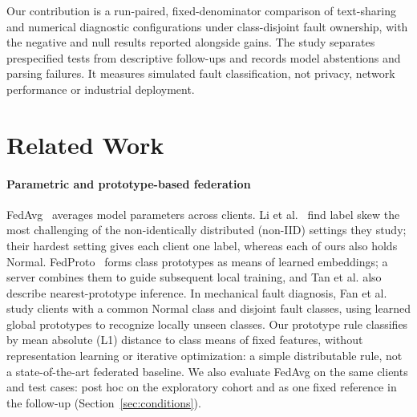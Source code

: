 \documentclass[conference]{IEEEtran}
\begin{document}
Our contribution is a run-paired, fixed-denominator comparison of text-sharing and numerical diagnostic configurations under class-disjoint fault ownership, with the negative and null results reported alongside gains. The study separates prespecified tests from descriptive follow-ups and records model abstentions and parsing failures. It measures simulated fault classification, not privacy, network performance or industrial deployment.


\section{Related Work}
\label{sec:related}

\paragraph{Parametric and prototype-based federation}
\mbox{FedAvg}~\cite{mcmahan2017fedavg} averages model parameters across clients. Li et al.~\cite{li2022noniid} find label skew the most challenging of the non-identically distributed (non-IID) settings they study; their hardest setting gives each client one label, whereas each of ours also holds Normal. FedProto~\cite{tan2022fedproto} forms class prototypes as means of learned embeddings; a server combines them to guide subsequent local training, and Tan et al. also describe nearest-prototype inference. In mechanical fault diagnosis, Fan et al.~\cite{fan2025prototype} study clients with a common Normal class and disjoint fault classes, using learned global prototypes to recognize locally unseen classes. Our prototype rule classifies by mean absolute (L1) distance to class means of fixed features, without representation learning or iterative optimization: a simple distributable rule, not a state-of-the-art federated baseline. We also evaluate FedAvg on the same clients and test cases: post hoc on the exploratory cohort and as one fixed reference in the follow-up (Section~\ref{sec:conditions}).
\end{document}
